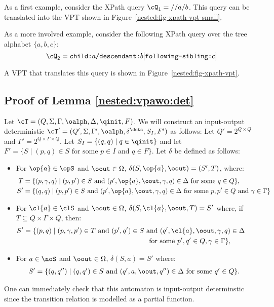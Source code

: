 As a first example, consider the XPath query $\cQ_1 = {\tt //}a{\tt /}b$. This query can be translated into the VPT shown in Figure~\ref{nested:fig-xpath-vpt-small}. 



As a more involved example, consider the following XPath query over the tree alphabet $\{a, b, c\}$: 
$$
\cQ_2 = \texttt{child:}a\texttt{/descendant:}b[\texttt{following-sibling:}c]
$$

A VPT that translates this query is shown in Figure~\ref{nested:fig-xpath-vpt}.
	



\subsection{Proof of Lemma \ref{nested:vpawo:det}}

Let $\cT = (Q, \Sigma, \Gamma, \oalph, \Delta, \qinit, F)$.
We will construct an input-output deterministic \vpt $\cT' = ( Q', \Sigma, \Gamma', \oalph, \delta^\dets, S_{I}, F')$ as follows:
Let $Q' = 2^{Q\times Q}$ and $\Gamma' = 2^{Q\times\Gamma\times Q}$. 
Let $S_I = \{(q,q)\mid q\in \qinit\}$ and let $F' = \{S\mid (p,q)\in S\text{ for some }p\in I \text{ and } q\in F \}$. 
Let $\delta$ be defined as follows:
\begin{itemize}
	\item For $\op{a}\in \opS$ and $\oout\in\Omega$, $\delta(S,\op{a},\oout) = (S',T)$, where:
	\begin{align*}
		T &= \{(p,\gamma,q)\mid (p,p')\in S \text{ and } (p',\op{a},\oout,\gamma,q)\in\Delta\text{ for some }q\in Q \},\\
		S'&= \{(q,q)\mid(p,p')\in S\text{ and }(p',\op{a},\oout,\gamma,q)\in\Delta\text{ for some }p,p'\in Q \text{ and } \gamma\in\Gamma\}
	\end{align*}
	\item For $\cl{a}\in\clS$ and $\oout\in\Omega$, $\delta(S,\cl{a},\oout,T) = S'$ where, if $T\subseteq Q\times\Gamma\times Q$, then: 
	\begin{align*}
		S' &= \{(p,q)\mid(p,\gamma,p')\in T\text{ and }(p',q')\in S\text{ and }(q',\cl{a},\oout,\gamma,q)\in\Delta\ \ \ \ \ \ \ \ \ \ \ \\ &\ \ \ \ \ \ \ \ \ \ \ \ \ \ \ \ \ \ \ \ \ \ \ \ \ \ \ \ \ \ \ \ \ \ \ \ \ \ \ \ \ \ \ \ \ \ \ \ \ \ \ \ \ \text{ for some }p',q'\in Q,\gamma\in\Gamma\},
	\end{align*}
	\item For $a\in\noS$ and $\oout\in\Omega$, $\delta(S,a) = S'$ where:
	\begin{align*}
		S' &= \{(q,q'')\mid (q,q')\in S\text{ and }(q',a,\oout,q'')\in\Delta\text{ for some }q'\in Q\}.
	\end{align*}
\end{itemize}
One can immediately check that this automaton is input-output determinstic since the transition relation is modelled as a partial function.


